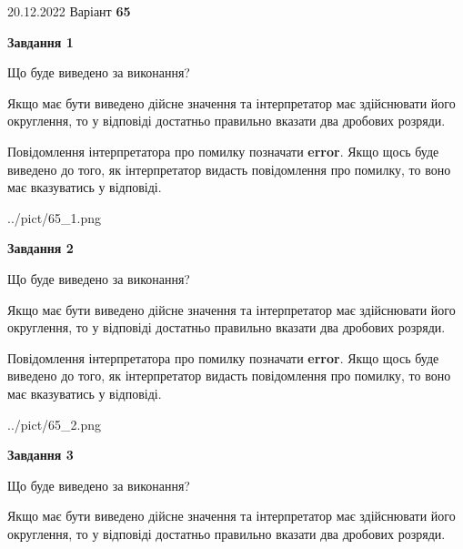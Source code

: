 \documentclass[12pt, ukrainian]{article}
\begin{document}
{20.12.2022 Варіант \No \textbf { 65 }\par}
{
\begin {Large}

{\begin {center}\textbf{Завдання 1}\end {center}}\par
Що буде виведено за виконання? \par

Якщо має бути виведено дійсне значення та інтерпретатор має здійснювати його округлення, 
то у відповіді достатньо правильно вказати два дробових розряди.

Повідомлення інтерпретатора про помилку позначати \textbf{error}.
Якщо щось буде виведено до того, як інтерпретатор видасть повідомлення про помилку, 
то воно має вказуватись у відповіді. \par

\begin{center}
	{../pict/65_1.png}
\end{center}
\newpage

{\begin {center}\textbf{Завдання 2}\end {center}}\par
Що буде виведено за виконання? \par

Якщо має бути виведено дійсне значення та інтерпретатор має здійснювати його округлення, 
то у відповіді достатньо правильно вказати два дробових розряди.

Повідомлення інтерпретатора про помилку позначати \textbf{error}.
Якщо щось буде виведено до того, як інтерпретатор видасть повідомлення про помилку, 
то воно має вказуватись у відповіді. \par

\begin{center}
	{../pict/65_2.png}
\end{center}
\newpage

{\begin {center}\textbf{Завдання 3}\end {center}}\par
Що буде виведено за виконання? \par

Якщо має бути виведено дійсне значення та інтерпретатор має здійснювати його округлення, 
то у відповіді достатньо правильно вказати два дробових розряди.


\end{Large}}
\end{document}
